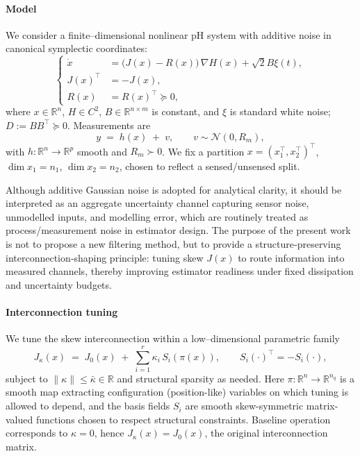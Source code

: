 \documentclass[final,5p,times,twocolumn]{elsarticle}
\newcommand{\R}{\mathbb{R}}
\begin{document}
	\paragraph*{Model}
	We consider a finite--dimensional nonlinear pH system with additive noise in canonical symplectic coordinates:
	\begin{equation}\label{eq:pH}
		\begin{cases}
			\dot x &= \big(J(x)-R(x)\big)\,\nabla H(x) + \sqrt{2}B\xi(t),\\
			J(x)^\top&=-J(x),\\
			R(x)&=R(x)^\top\succeq 0,
		\end{cases}
	\end{equation}
	where \(x\in\R^n\), \(H\in C^2\), \(B\in\R^{n\times m}\) is constant, and \(\xi\) is standard white noise; \(D:=BB^\top\succeq 0\). Measurements are
	\begin{equation}\label{eq:meas}
		y \;=\; h(x)\;+\;v,\qquad v\sim \mathcal N(0,R_m),
	\end{equation}
	with \(h:\R^n\to\R^p\) smooth and \(R_m\succ0\). We fix a partition \(x=(x_1^\top,x_2^\top)^\top\), \(\dim x_1=n_1\), \(\dim x_2=n_2\), chosen to reflect a sensed/unsensed split.
	
	Although additive Gaussian noise is adopted for analytical clarity, it should be interpreted as an aggregate uncertainty channel capturing sensor noise, unmodelled inputs, and modelling error, which are routinely treated as process/measurement noise in estimator design. The purpose of the present work is not to propose a new filtering method, but to provide a structure‑preserving interconnection‑shaping principle: tuning skew $J(x)$ to route information into measured channels, thereby improving estimator readiness under fixed dissipation and uncertainty budgets.
	
	\paragraph*{Interconnection tuning}
	We tune the skew interconnection within a low--dimensional parametric family
	\begin{equation}\label{eq:Jtheta}
		J_{\kappa}(x)
		\;=\;
		J_0(x) \;+\; \sum_{i=1}^r \kappa_i\,S_i(\pi(x)),
		\qquad S_i(\cdot)^\top=-S_i(\cdot),
	\end{equation}
	subject to $\|\kappa\|\le \bar\kappa\in\mathbb{R}$ and structural sparsity as needed. Here $\pi:\mathbb{R}^n\to\mathbb{R}^{n_q}$ is a smooth map extracting configuration (position-like) variables on which tuning is allowed to depend, and the basis fields $S_i$ are smooth skew-symmetric matrix-valued functions chosen to respect structural constraints. Baseline operation corresponds to $\kappa=0$, hence $J_{\kappa}(x)=J_0(x)$, the original interconnection matrix.
	
\end{document}
